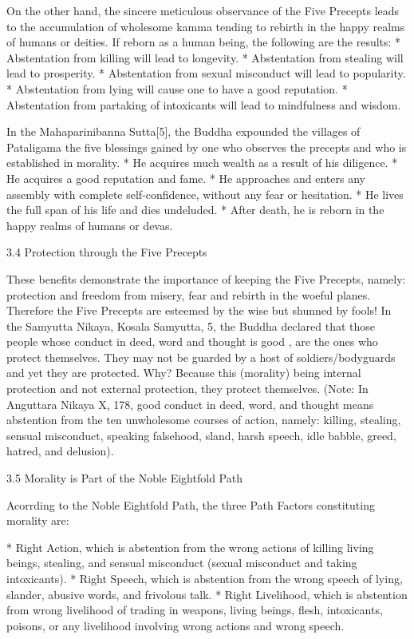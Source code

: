 On the other hand, the sincere meticulous observance of the Five Precepts leads to the accumulation of wholesome kamma tending to rebirth in the happy realms of humans or deities. If reborn as a human being, the following are the results:
* Abstentation from killing will lead to longevity.
* Abstentation from stealing will lead to prosperity.
* Abstentation from sexual misconduct will lead to popularity.
* Abstentation from lying will cause one to have a good reputation.
* Abstentation from partaking of intoxicants will lead to mindfulness and wisdom.

In the Mahaparinibanna Sutta[5], the Buddha expounded the villages of Pataligama the five blessings gained by one who observes the precepts and who is established in morality.
* He acquires much wealth as a result of his diligence.
* He acquires a good reputation and fame.
* He approaches and enters any assembly with complete self-confidence, without any fear or hesitation.
* He lives the full span of his life and dies undeluded.
* After death, he is reborn in the happy realms of humans or devas.

3.4 Protection through the Five Precepts

These benefits demonstrate the importance of keeping the Five Precepts, namely: protection and freedom from misery, fear and rebirth in the woeful planes. Therefore the Five Precepts are esteemed by the wise but shunned by fools! In the Samyutta Nikaya, Kosala Samyutta, 5, the Buddha declared that those people whose conduct in deed, word and thought is good , are the ones who protect themselves. They may not be guarded by a host of soldiers/bodyguards and yet they are protected. Why? Because this (morality) being internal protection and not external protection, they protect themselves. (Note: In Anguttara Nikaya X, 178, good conduct in deed, word, and thought means abstention from the ten unwholesome courses of action, namely: killing, stealing, sensual misconduct, speaking falsehood, sland, harsh speech, idle babble, greed, hatred, and delusion).

3.5 Morality is Part of the Noble Eightfold Path

Acorrding to the Noble Eightfold Path, the three Path Factors constituting morality are:

* Right Action, which is abstention from the wrong actions of killing living beings, stealing, and sensual misconduct (sexual misconduct and taking intoxicants).
* Right Speech, which is abstention from the wrong speech of lying, slander, abusive words, and frivolous talk.
* Right Livelihood, which is abstention from wrong livelihood of trading in weapons, living beings, flesh, intoxicants, poisons, or any livelihood involving wrong actions and wrong speech.

